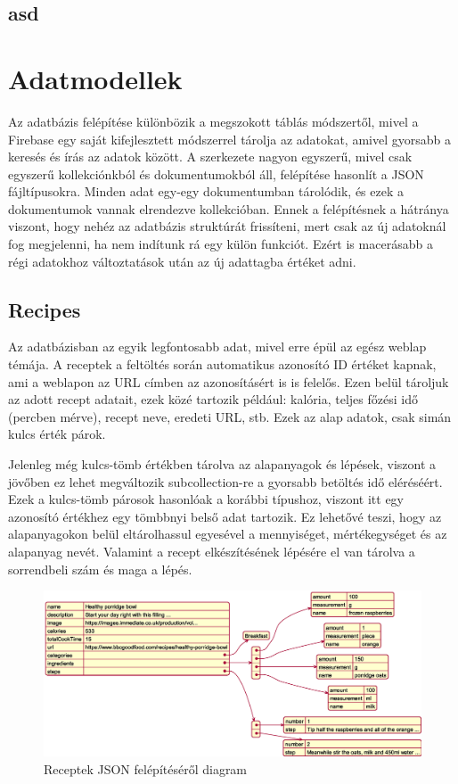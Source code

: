 \documentclass[12pt]{report}
\theoremstyle{definition}
\begin{document}
\section{asd}


\chapter{Adatmodellek}
Az adatbázis felépítése különbözik a megszokott táblás módszertől, mivel a Firebase egy saját kifejlesztett módszerrel tárolja az adatokat, amivel gyorsabb a keresés és írás az adatok között. A szerkezete nagyon egyszerű, mivel csak egyszerű kollekciónkból és dokumentumokból áll, felépítése hasonlít a JSON fájltípusokra. Minden adat egy-egy dokumentumban tárolódik, és ezek a dokumentumok vannak elrendezve kollekcióban. Ennek a felépítésnek a hátránya viszont, hogy nehéz az adatbázis struktúrát frissíteni, mert csak az új adatoknál fog megjelenni, ha nem indítunk rá egy külön funkciót. Ezért is macerásabb a régi adatokhoz változtatások után az új adattagba értéket adni. 

\section{Recipes}
Az adatbázisban az egyik legfontosabb adat, mivel erre épül az egész weblap témája. A receptek a feltöltés során automatikus azonosító ID értéket kapnak, ami a weblapon az URL címben az azonosításért is is felelős. Ezen belül tároljuk az adott recept adatait, ezek közé tartozik például: kalória, teljes főzési idő (percben mérve), recept neve, eredeti URL, stb. Ezek az alap adatok, csak simán kulcs érték párok. 

Jelenleg még kulcs-tömb értékben tárolva az alapanyagok és lépések, viszont a jövőben ez lehet megváltozik subcollection-re a gyorsabb betöltés idő eléréséért. Ezek a kulcs-tömb párosok hasonlóak a korábbi típushoz, viszont itt egy azonosító értékhez egy tömbbnyi belső adat tartozik. Ez lehetővé teszi, hogy az alapanyagokon belül eltárolhassul egyesével a mennyiséget, mértékegységet és az alapanyag nevét. Valamint a recept elkészítésének lépésére el van tárolva a sorrendbeli szám és maga a lépés.

\noindent
\begin{figure}[H]
	\centering
	\includegraphics[width=\textwidth]{out/diagrams/jsonRecipes/jsonRecipes.eps}
	\caption{Receptek JSON felépítéséről diagram}
    \label{fig:jsonRecipes}
\end{figure}
\end{document}
